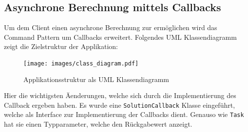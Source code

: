 \subsection{Asynchrone Berechnung mittels Callbacks}
Um dem Client einen asynchrone Berechnung zur erm\"oglichen wird das Command Pattern um Callbacks\cite{command-pattern-callback} erweitert.
Folgendes UML Klassendiagramm zeigt die Zielstruktur der Applikation:

\begin{figure}[H]
	\begin{center}
		\texttt{[image: images/class\_diagram.pdf]}
		\caption{Applikationsstruktur als UML Klassendiagramm}
		\label{broker}
	\end{center}
\end{figure}

Hier die wichtigsten \"Aenderungen, welche sich durch die Implementierung des Callback ergeben haben.
Es wurde eine \texttt{SolutionCallback} Klasse eingef\"uhrt, welche als Interface zur Implementierung der Callbacks dient.
Genauso wie \texttt{Task} hat sie einen Typparameter, welche den R\"uckgabewert anzeigt.

